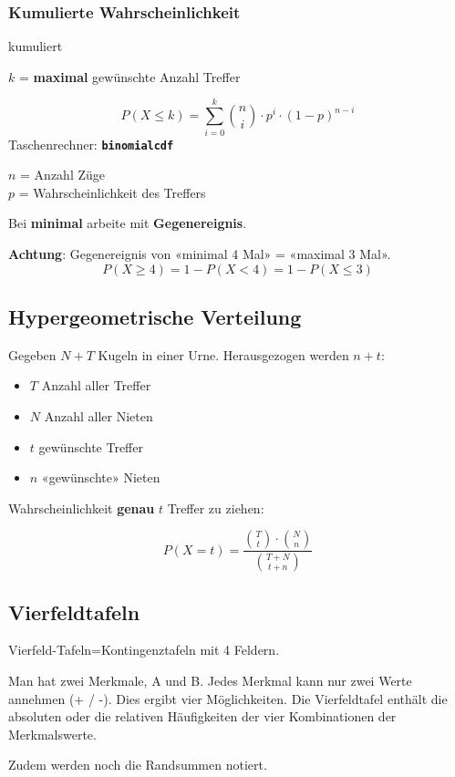 \begin{multicols}{2}
\subsubsection*{Kumulierte Wahrscheinlichkeit}

\begin{gesetz*}{kumuliert}{}

$k$ = \textbf{maximal} gewünschte Anzahl Treffer


$$P(X\le k) = \sum_{i=0}^{k}{n \choose i}\cdot{}p^i\cdot{}(1-p)^{n-i}$$
Taschenrechner: \textbf{\texttt{binomialcdf}}

$n$ = Anzahl Züge\\
$p$ = Wahrscheinlichkeit des Treffers\\
\end{gesetz*}
Bei \textbf{minimal} arbeite mit \textbf{Gegenereignis}.

\textbf{Achtung}: Gegenereignis von «minimal 4 Mal» = «maximal 3 Mal».
$$P(X \ge 4) = 1 - P(X < 4) = 1-P(X\le 3)$$


\subsection*{Hypergeometrische Verteilung}
Gegeben $N+T$ Kugeln in einer Urne. Herausgezogen werden $n+t$:
\begin{itemize}
\item $T$ Anzahl aller Treffer
\item $N$ Anzahl aller Nieten
\item $t$ gewünschte Treffer
\item $n$ «gewünschte» Nieten
\end{itemize}
Wahrscheinlichkeit \textbf{genau} $t$ Treffer zu ziehen:

$$P(X=t) = \frac{ {T \choose t} \cdot {N  \choose n} }{{T+N \choose t+n}}$$


\forceCB

\subsection*{Vierfeldtafeln}
Vierfeld-Tafeln=Kontingenztafeln mit 4 Feldern.

Man hat zwei Merkmale, A und B. Jedes Merkmal kann nur zwei Werte
annehmen (+ / -). Dies ergibt vier Möglichkeiten. Die Vierfeldtafel
enthält die absoluten oder die relativen Häufigkeiten der vier
Kombinationen der Merkmalswerte.

Zudem werden noch die Randsummen notiert.


\end{multicols}
